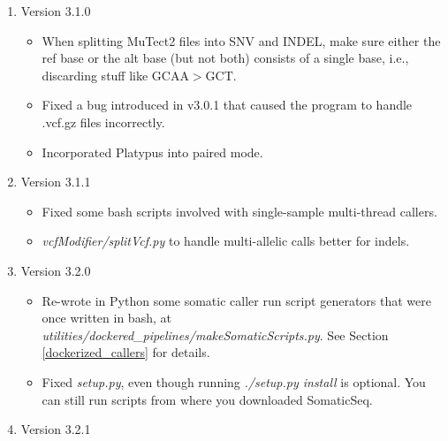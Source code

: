 \documentclass[10pt,letterpaper]{article}
\begin{document}
\begin{sloppypar}
\begin{enumerate}
\begin{itemize}
		\end{itemize}
	


	\item Version 3.1.0
		\begin{itemize}
		
		  \item
		  When splitting MuTect2 files into SNV and INDEL, make sure either the ref base or the alt base (but not both) consists of a single base, i.e., discarding stuff like GCAA$>$GCT.
		  
		  \item
		  Fixed a bug introduced in v3.0.1 that caused the program to handle .vcf.gz files incorrectly.
		  
          \item
          Incorporated Platypus into paired mode.
		  
		\end{itemize}

		
    \item Version 3.1.1
        \begin{itemize}
         
         \item 
         Fixed some bash scripts involved with single-sample multi-thread callers.
         
         \item
         \textit{vcfModifier/splitVcf.py} to handle multi-allelic calls better for indels. 
         
        \end{itemize}


	\item Version 3.2.0
        \begin{itemize}
         
         \item 
         Re-wrote in Python some somatic caller run script generators that were once written in bash, at \textit{utilities/dockered\_pipelines/makeSomaticScripts.py}. See Section \ref{dockerized_callers} for details. 
         
         \item
         Fixed \textit{setup.py}, even though running \textit{./setup.py install} is optional. You can still run scripts from where you downloaded SomaticSeq. 
 
        \end{itemize}


	\item Version 3.2.1
	

\end{enumerate}
\end{sloppypar}
\end{document}
